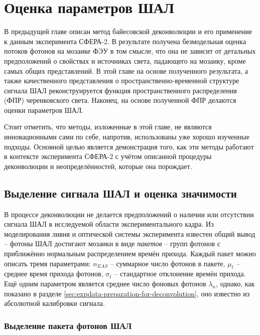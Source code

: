 \chapter{Оценка параметров ШАЛ}

В предыдущей главе описан метод байесовской деконволюции и его применение к данным эксперимента СФЕРА-2. В результате получена безмодельная оценка потоков фотонов на мозаике ФЭУ в том смысле, что она не зависит от детальных предположений о свойствах и источниках света, падающего на мозаику, кроме самых общих представлений. В этой главе на основе полученного результата, а также качественного представления о пространственно-временной структуре сигнала ШАЛ реконструируется функция пространственного распределения (ФПР) черенковского света. Наконец, на основе полученной ФПР делаются оценки параметров ШАЛ.

Стоит отметить, что методы, изложенные в этой главе, не являются инновационными сами по себе, напротив, использованы уже хорошо изученные подходы. Основной целью является демонстрация того, как эти методы работают в контексте эксперимента СФЕРА-2 с учётом описанной процедуры деконволюции и неопределённостей, которые она порождает.

\section{Выделение сигнала ШАЛ и оценка значимости}

В процессе деконволюции не делается предположений о наличии или отсутствии сигнала ШАЛ в исследуемой области экспериментального кадра. Из моделирования ливня и оптической системы эксперимента известен общий вывод -- фотоны ШАЛ достигают мозаики в виде \textit{пакетов} -- групп фотонов с приближённо нормальным распределением времён прихода. Каждый пакет можно описать тремя параметрами: $n_{EAS}$ -- суммарное число фотонов в пакете, $\mu_t$ -- среднее время прихода фотонов, $\sigma_t$ -- стандартное отклонение времён прихода. Ещё одним параметром является среднее число фоновых фотонов $\lambda_{n}$, однако, как показано в разделе \ref{sec:expdata-preparation-for-deconvolution}, оно известно из абсолютной калибровки сигнала.

\subsection{Выделение пакета фотонов ШАЛ}

\label{sec:signal-reconstruction}

